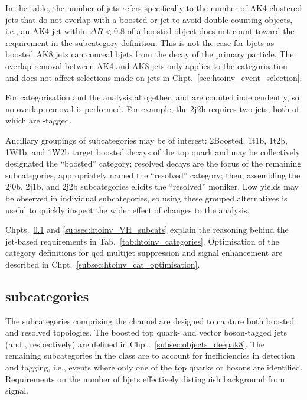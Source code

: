 In the table, the number of \glspl{jet} \njet refers specifically to the number of AK4-clustered \glspl{jet} that do not overlap with a boosted \Ptop or \PVec \gls{jet} to avoid double counting objects, i.e., an AK4 \gls{jet} within $\Delta R < \text{0.8}$ of a boosted object does not count toward the \njet requirement in the subcategory definition. This is not the case for \glspl{bjet} as boosted AK8 \glspl{jet} can conceal \glspl{bjet} from the decay of the primary particle. The overlap removal between AK4 and AK8 \glspl{jet} only applies to the categorisation and does not affect selections made on \glspl{jet} in Chpt.~\ref{sec:htoinv_event_selection}.

For categorisation and the analysis altogether, \njet and \nbjet are counted independently, so no overlap removal is performed. For example, the \VH 2j2b requires two \glspl{jet}, both of which are \Pbottom-tagged.

Ancillary groupings of subcategories may be of interest: 2Boosted, 1t1b, 1t2b, 1W1b, and 1W2b target boosted decays of the top quark and may be collectively designated the ``\ttH boosted'' category; resolved decays are the focus of the remaining subcategories, appropriately named the ``\ttH resolved'' category; then, assembling the 2j0b, 2j1b, and 2j2b \VH subcategories elicits the ``\VH resolved'' moniker. Low yields may be observed in individual subcategories, so using these grouped alternatives is useful to quickly inspect the wider effect of changes to the analysis.

Chpts.~\ref{subsec:htoinv_ttH_subcats} and \ref{subsec:htoinv_VH_subcats} explain the reasoning behind the \gls{jet}-based requirements in Tab.~\ref{tab:htoinv_categories}. Optimisation of the category definitions for \acrshort{qcd} multijet suppression and signal enhancement are described in Chpt.~\ref{subsec:htoinv_cat_optimisation}.




\subsection{\texorpdfstring{\ttH}{ttH} subcategories}
\label{subsec:htoinv_ttH_subcats}

The subcategories comprising the \ttH channel are designed to capture both boosted and resolved topologies. The boosted top quark- and vector boson-tagged \glspl{jet} (\nBoostedTop and \nBoostedV, respectively) are defined in Chpt.~\ref{subsec:objects_deepak8}. The remaining subcategories in the class are to account for inefficiencies in detection and tagging, i.e., events where only one of the top quarks or \PW bosons are identified. Requirements on the number of \glspl{bjet} effectively distinguish background from signal.

